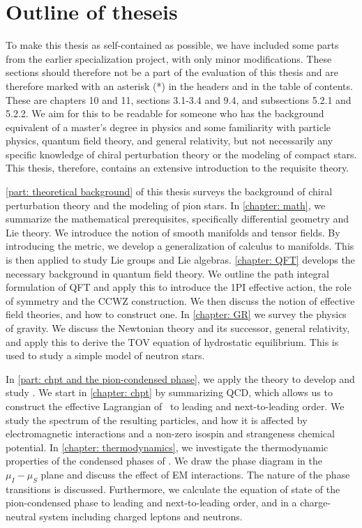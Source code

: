 \section{Outline of theseis}

To make this thesis as self-contained as possible, we have included some parts from the earlier specialization project, with only minor modifications.
These sections should therefore not be a part of the evaluation of this thesis and are therefore marked with an asterisk (*) in the headers and in the table of contents.
These are chapters 10 and 11, sections 3.1-3.4 and 9.4, and subsections 5.2.1 and 5.2.2.
We aim for this to be readable for someone who has the background equivalent of a master's degree in physics and some familiarity with particle physics, quantum field theory, and general relativity, but not necessarily any specific knowledge of chiral perturbation theory or the modeling of compact stars.
This thesis, therefore, contains an extensive introduction to the requisite theory.

\autoref{part: theoretical background} of this thesis surveys the background of chiral perturbation theory and the modeling of pion stars.
In \autoref{chapter: math}, we summarize the mathematical prerequisites, specifically differential geometry and Lie theory.
We introduce the notion of smooth manifolds and tensor fields.
By introducing the metric, we develop a generalization of calculus to manifolds.
This is then applied to study Lie groups and Lie algebras.
\autoref{chapter: QFT} develops the necessary background in quantum field theory.
We outline the path integral formulation of QFT and apply this to introduce the 1PI effective action, the role of symmetry and the CCWZ construction.
We then discuss the notion of effective field theories, and how to construct one.
In \autoref{chapter: GR} we survey the physics of gravity.
We discuss the Newtonian theory and its successor, general relativity, and apply this to derive the TOV equation of hydrostatic equilibrium.
This is used to study a simple model of neutron stars.

In \autoref{part: chpt and the pion-condensed phase}, we apply the theory to develop and study \chpt.
We start in \autoref{chapter: chpt} by summarizing QCD, which allows us to construct the effective Lagrangian of \chpt\, to leading and next-to-leading order.
We study the spectrum of the resulting particles, and how it is affected by electromagnetic interactions and a non-zero isospin and strangeness chemical potential.
In \autoref{chapter: thermodynamics}, we investigate the thermodynamic properties of the condensed phases of \chpt.
We draw the phase diagram in the $\mu_I-\mu_S$ plane and discuss the effect of EM interactions.
The nature of the phase transitions is discussed.
Furthermore, we calculate the equation of state of the pion-condensed phase to leading and next-to-leading order, and in a charge-neutral system including charged leptons and neutrons.

